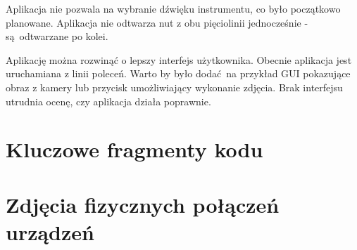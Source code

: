 \documentclass[12pt]{article}
\begin{document}
Aplikacja nie pozwala na wybranie dźwięku instrumentu, co było początkowo planowane. Aplikacja nie odtwarza nut z obu pięciolinii jednocześnie - są odtwarzane po kolei.
	
Aplikację można rozwinąć o lepszy interfejs użytkownika. Obecnie aplikacja jest uruchamiana z linii poleceń. Warto by było dodać na przykład GUI pokazujące obraz z kamery lub przycisk umożliwiający wykonanie zdjęcia. Brak interfejsu utrudnia ocenę, czy aplikacja działa poprawnie.

\section{Kluczowe fragmenty kodu}

\section{Zdjęcia fizycznych połączeń urządzeń}
\end{document}
